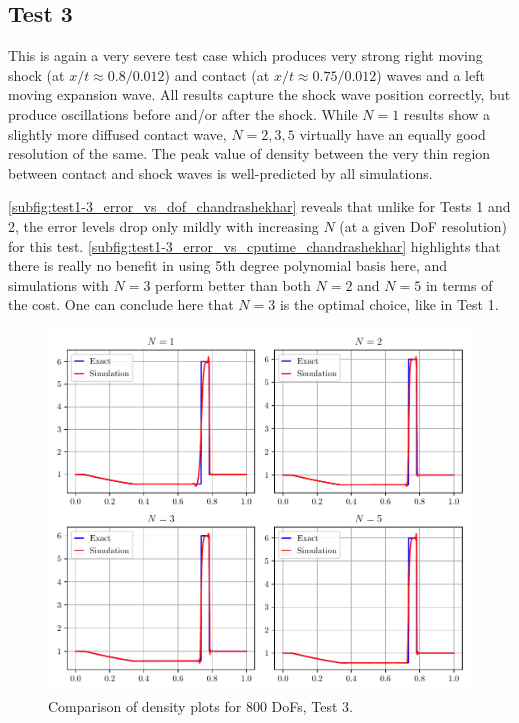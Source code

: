 \documentclass[a4paper,11pt,oneside]{article}
\begin{document}
\subsection{Test 3}
\label{subsec:test1-3}

This is again a very severe test case which produces very strong right moving shock (at $x/t \approx 0.8/0.012$) and contact (at $x/t \approx 0.75/0.012$) waves and a left moving expansion wave. All results capture the shock wave position correctly, but produce oscillations before and/or after the shock. While $N=1$ results show a slightly more diffused contact wave, $N=2,3,5$ virtually have an equally good resolution of the same. The peak value of density between the very thin region between contact and shock waves is well-predicted by all simulations.

\cref{subfig:test1-3_error_vs_dof_chandrashekhar} reveals that unlike for Tests 1 and 2, the error levels drop only mildly with increasing $N$ (at a given DoF resolution) for this test. \cref{subfig:test1-3_error_vs_cputime_chandrashekhar} highlights that there is really no benefit in using 5th degree polynomial basis here, and simulations with $N=3$ perform better than both $N=2$ and $N=5$ in terms of the cost. One can conclude here that $N=3$ is the optimal choice, like in Test 1.

\begin{figure}[htbp]
	\includegraphics[width=\linewidth]{figures/riemann_1d/test1-3/dof800_12_12_chandrashekhar.pdf}
	\caption{Comparison of density plots for 800 DoFs, Test 3.}
	\label{fig:test1-3_dof800_chandrashekhar}
\end{figure}
\end{document}
